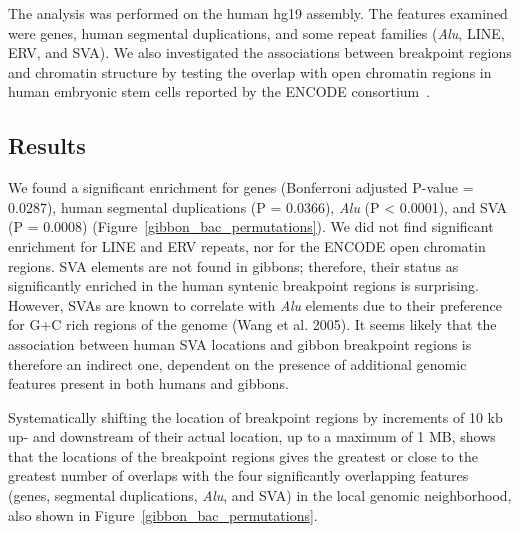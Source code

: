 The analysis was performed on the human hg19 assembly. The features examined were genes, human segmental duplications, and some repeat families (\emph{Alu}, LINE, ERV, and SVA). We also investigated the associations between breakpoint regions and chromatin structure by testing the overlap with open chromatin regions in human embryonic stem cells reported by the ENCODE consortium~\cite{ENCODEProjectConsortium:2011iz}. 

\subsection{Results}

We found a significant enrichment for genes (Bonferroni adjusted P-value = 0.0287), human segmental duplications (P = 0.0366), \emph{Alu} (P < 0.0001), and SVA (P = 0.0008) (Figure~\ref{gibbon_bac_permutations}). We did not find significant enrichment for LINE and ERV repeats, nor for the ENCODE open chromatin regions. SVA elements are not found in gibbons; therefore, their status as significantly enriched in the human syntenic breakpoint regions is surprising. However, SVAs are known to correlate with \emph{Alu} elements due to their preference for G+C rich regions of the genome (Wang et al. 2005). It seems likely that the association between human SVA locations and gibbon breakpoint regions is therefore an indirect one, dependent on the presence of additional genomic features present in both humans and gibbons. 

Systematically shifting the location of breakpoint regions by increments of 10 kb up- and downstream of their actual location, up to a maximum of 1 MB, shows that the locations of the breakpoint regions gives the greatest or close to the greatest number of overlaps with the four significantly overlapping features (genes, segmental duplications, \emph{Alu}, and SVA) in the local genomic neighborhood, also shown in Figure~\ref{gibbon_bac_permutations}.

